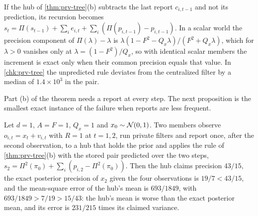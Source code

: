 \begin{remark}\label{rem:prv-predicted}
If the hub of \cref{thm:prv-tree}(b) subtracts the last report $c_{i,t-1}$ and not its prediction, its recursion becomes $s_t=\Pi(s_{t-1})+\sum_i e_{i,t}+\sum_i(\Pi(p_{i,t-1})-p_{i,t-1})$. In a scalar world the precision component of $\Pi(\lambda)-\lambda$ is $\lambda(1-F^2-Q_x\lambda)/(F^2+Q_x\lambda)$, which for $\lambda>0$ vanishes only at $\lambda=(1-F^2)/Q_x$, so with identical scalar members the increment is exact only when their common precision equals that value. In \cref{chk:prv-tree} the unpredicted rule deviates from the centralized filter by a median of $1.4\times10^{3}$ in the pair.
\end{remark}

Part (b) of the theorem needs a report at every step. The next proposition is the smallest exact instance of the failure when reports are less frequent.

\begin{proposition}\label{prop:prv-intermittent}
Let $d=1$, $A=F=1$, $Q_x=1$ and $x_0\sim\mathcal{N}(0,1)$. Two members observe $o_{i,t}=x_t+v_{i,t}$ with $R=1$ at $t=1,2$, run private filters and report once, after the second observation, to a hub that holds the prior and applies the rule of \cref{thm:prv-tree}(b) with the stored pair predicted over the two steps, $s_2=\Pi^2(\pi_0)+\sum_i(p_{i,2}-\Pi^2(\pi_0))$. Then the hub claims precision $43/15$, the exact posterior precision of $x_2$ given the four observations is $19/7<43/15$, and the mean-square error of the hub's mean is $693/1849$, with $693/1849>7/19>15/43$: the hub's mean is worse than the exact posterior mean, and its error is $231/215$ times its claimed variance.
\end{proposition}

